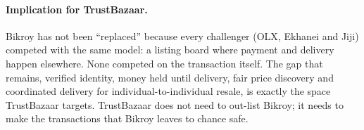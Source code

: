 \documentclass[11pt,a4paper]{article}
\begin{document}
\paragraph{Implication for TrustBazaar.} Bikroy has not been ``replaced'' because every
challenger (OLX, Ekhanei and Jiji) competed with the same model: a listing board where
payment and delivery happen elsewhere. None competed on the transaction itself. The gap
that remains, verified identity, money held until delivery, fair price discovery and
coordinated delivery for individual-to-individual resale, is exactly the space TrustBazaar
targets. TrustBazaar does not need to out-list Bikroy; it needs to make the transactions
that Bikroy leaves to chance safe.





\end{document}

